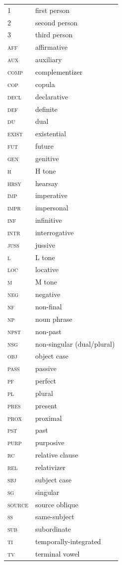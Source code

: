 \documentclass[output=paper]{langsci/langscibook}
\begin{document}
\begin{tabular}{ll}
1 & first person\\
2 & second person\\
3 & third person\\
\textsc{aff}     & affirmative\\
\textsc{aux}     & auxiliary\\
\textsc{comp}     & complementizer\\
\textsc{cop}     & copula\\
\textsc{decl}     & declarative\\
\textsc{def}     & definite\\
\textsc{du}     & dual\\
\textsc{exist}     & existential \\
\textsc{fut}     & future \\
\textsc{gen}     & genitive\\
\textsc{h}     & H tone\\
\textsc{hrsy}     & hearsay\\
\textsc{imp}     & imperative\\
\textsc{impr}     & impersonal\\
\textsc{inf}     & infinitive\\
\textsc{intr}     & interrogative\\
\textsc{juss}     & jussive\\
\textsc{l}     & L tone\\
\textsc{loc}     & locative\\
\textsc{m}     & M tone\\
\textsc{neg}     & negative\\
\textsc{nf}      & non-final\\
\textsc{np}     & noun phrase\\
\textsc{npst}     & non-past\\
\textsc{nsg}     & non-singular (dual/plural)\\
\textsc{obj}     & object case\\
\textsc{pass}     & passive \\
\textsc{pf}     & perfect\\
\textsc{pl}     & plural\\
\textsc{pres}     & present \\
\textsc{prox}     & proximal\\
\textsc{pst}     & past \\
\textsc{purp}     & purposive\\
\textsc{rc}     & relative clause\\
\textsc{rel}     & relativizer\\
\textsc{sbj}     & subject case\\
\textsc{sg}     & singular\\
\textsc{source}   & source oblique\\
\textsc{ss}     & same-subject\\
\textsc{sub}    & subordinate\\
\textsc{ti}     & temporally-integrated\\
\textsc{tv}    & terminal vowel\\
\end{tabular}


\printbibliography[heading=subbibliography,notkeyword=this]
\end{document}
